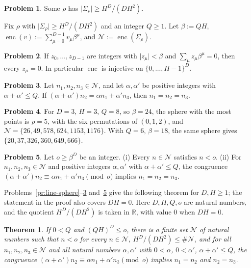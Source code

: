 \documentclass[reqno]{amsart}
\theoremstyle{definition}
\newtheorem{problem}{Problem}[section]
\theoremstyle{plain}
\newtheorem{theorem}{Theorem}[section]
\newcommand{\R}{\mathbb{R}}
\newcommand{\Nc}{\mathcal{N}}
\newcommand{\enc}{\operatorname{enc}}
\begin{document}
\begin{problem}\label{pr:pigeonhole}
Some \(\rho\) has \(\lvert\Sigma_\rho\rvert \ge H^D/(DH^2)\).
\end{problem}

Fix \(\rho\) with \(\lvert\Sigma_\rho\rvert \ge H^D/(DH^2)\) and an integer \(Q \ge 1\).  Let \(\beta := QH\), \(\enc(v) := \sum_{\mu=0}^{D-1} v_\mu \beta^\mu\), and \(\Nc := \enc(\Sigma_\rho)\).

\begin{problem}\label{pr:digits}
If \(z_0, \dots, z_{D-1}\) are integers with \(\lvert z_\mu\rvert < \beta\) and \(\sum_\mu z_\mu \beta^\mu = 0\), then every \(z_\mu = 0\).  In particular \(\enc\) is injective on \(\{0, \dots, H-1\}^D\).
\end{problem}

\begin{problem}\label{pr:no-relation}
Let \(n_1, n_2, n_3 \in \Nc\), and let \(\alpha, \alpha'\) be positive integers with \(\alpha + \alpha' \le Q\).  If \((\alpha + \alpha')n_2 = \alpha n_1 + \alpha' n_3\), then \(n_1 = n_2 = n_3\).
\end{problem}

\begin{problem}\label{pr:example}
For \(D = 3\), \(H = 3\), \(Q = 8\), so \(\beta = 24\), the sphere with the most points is \(\rho = 5\), with the six permutations of \((0, 1, 2)\), and \(\Nc = \{26, 49, 578, 624, 1153, 1176\}\).  With \(Q = 6\), \(\beta = 18\), the same sphere gives \(\{20, 37, 326, 360, 649, 666\}\).
\end{problem}

\begin{problem}\label{pr:size}
Let \(o \ge \beta^D\) be an integer.  (i) Every \(n \in \Nc\) satisfies \(n < o\).  (ii) For \(n_1, n_2, n_3 \in \Nc\) and positive integers \(\alpha, \alpha'\) with \(\alpha + \alpha' \le Q\), the congruence \((\alpha + \alpha')n_2 \equiv \alpha n_1 + \alpha' n_3 \pmod o\) implies \(n_1 = n_2 = n_3\).
\end{problem}

Problems~\ref{pr:line-sphere}--\ref{pr:no-relation} and~\ref{pr:size} give the following theorem for \(D, H \ge 1\); the statement in the proof also covers \(DH = 0\).  Here \(D, H, Q, o\) are natural numbers, and the quotient \(H^D/(DH^2)\) is taken in \(\R\), with value \(0\) when \(DH = 0\).

\begin{theorem}\label{thm:behrend}
If \(0 < Q\) and \((QH)^D \le o\), there is a finite set \(\Nc\) of natural numbers such that \(n < o\) for every \(n \in \Nc\), \(H^D/(DH^2) \le \#\Nc\), and for all \(n_1, n_2, n_3 \in \Nc\) and all natural numbers \(\alpha, \alpha'\) with \(0 < \alpha\), \(0 < \alpha'\), \(\alpha + \alpha' \le Q\), the congruence \((\alpha + \alpha')n_2 \equiv \alpha n_1 + \alpha' n_3 \pmod o\) implies \(n_1 = n_2\) and \(n_2 = n_3\).
\end{theorem}
\end{document}
